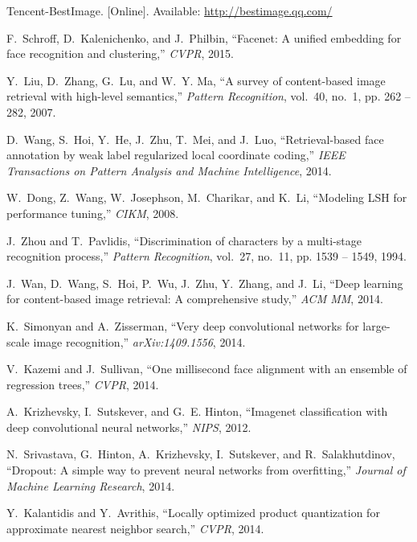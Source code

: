 \documentclass[10pt,journal,compsoc]{IEEEtran}
\begin{document}
\begin{thebibliography}{10}
\BIBentryALTinterwordspacing
Tencent-BestImage. [Online]. Available: \url{http://bestimage.qq.com/}
\BIBentrySTDinterwordspacing

F.~Schroff, D.~Kalenichenko, and J.~Philbin, ``Facenet: A unified embedding for
  face recognition and clustering,'' \emph{CVPR}, 2015.

Y.~Liu, D.~Zhang, G.~Lu, and W.~Y. Ma, ``A survey of content-based image
  retrieval with high-level semantics,'' \emph{Pattern Recognition}, vol.~40,
  no.~1, pp. 262 -- 282, 2007.

D.~Wang, S.~Hoi, Y.~He, J.~Zhu, T.~Mei, and J.~Luo, ``Retrieval-based face
  annotation by weak label regularized local coordinate coding,'' \emph{IEEE
  Transactions on Pattern Analysis and Machine Intelligence}, 2014.

W.~Dong, Z.~Wang, W.~Josephson, M.~Charikar, and K.~Li, ``Modeling {LSH} for
  performance tuning,'' \emph{CIKM}, 2008.

J.~Zhou and T.~Pavlidis, ``Discrimination of characters by a multi-stage
  recognition process,'' \emph{Pattern Recognition}, vol.~27, no.~11, pp. 1539
  -- 1549, 1994.

J.~Wan, D.~Wang, S.~Hoi, P.~Wu, J.~Zhu, Y.~Zhang, and J.~Li, ``Deep learning
  for content-based image retrieval: A comprehensive study,'' \emph{ACM MM},
  2014.

K.~Simonyan and A.~Zisserman, ``Very deep convolutional networks for
  large-scale image recognition,'' \emph{arXiv:1409.1556}, 2014.

V.~Kazemi and J.~Sullivan, ``One millisecond face alignment with an ensemble of
  regression trees,'' \emph{CVPR}, 2014.

A.~Krizhevsky, I.~Sutskever, and G.~E. Hinton, ``Imagenet classification with
  deep convolutional neural networks,'' \emph{NIPS}, 2012.

N.~Srivastava, G.~Hinton, A.~Krizhevsky, I.~Sutskever, and R.~Salakhutdinov,
  ``Dropout: A simple way to prevent neural networks from overfitting,''
  \emph{Journal of Machine Learning Research}, 2014.

Y.~Kalantidis and Y.~Avrithis, ``Locally optimized product quantization for
  approximate nearest neighbor search,'' \emph{CVPR}, 2014.


\end{thebibliography}
\end{document}
